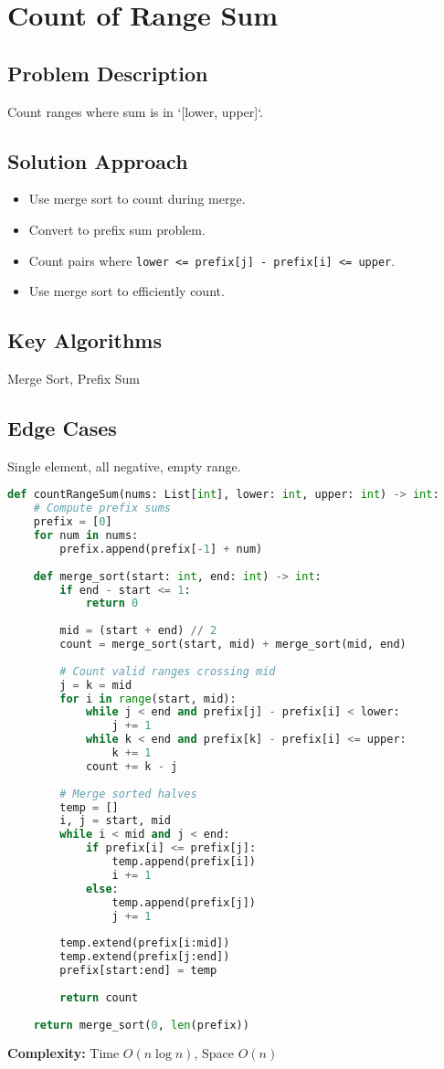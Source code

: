 \documentclass[10pt, a4paper]{article}
\begin{document}
\section{Count of Range Sum}
\subsection*{Problem Description}
Count ranges where sum is in `[lower, upper]`.

\subsection*{Solution Approach}
\begin{itemize}
    \item Use merge sort to count during merge.
    \item Convert to prefix sum problem.
    \item Count pairs where \texttt{lower <= prefix[j] - prefix[i] <= upper}.
    \item Use merge sort to efficiently count.
\end{itemize}

\subsection*{Key Algorithms}
Merge Sort, Prefix Sum

\subsection*{Edge Cases}
Single element, all negative, empty range.

\begin{lstlisting}[language=Python]
def countRangeSum(nums: List[int], lower: int, upper: int) -> int:
    # Compute prefix sums
    prefix = [0]
    for num in nums:
        prefix.append(prefix[-1] + num)
    
    def merge_sort(start: int, end: int) -> int:
        if end - start <= 1:
            return 0
        
        mid = (start + end) // 2
        count = merge_sort(start, mid) + merge_sort(mid, end)
        
        # Count valid ranges crossing mid
        j = k = mid
        for i in range(start, mid):
            while j < end and prefix[j] - prefix[i] < lower:
                j += 1
            while k < end and prefix[k] - prefix[i] <= upper:
                k += 1
            count += k - j
        
        # Merge sorted halves
        temp = []
        i, j = start, mid
        while i < mid and j < end:
            if prefix[i] <= prefix[j]:
                temp.append(prefix[i])
                i += 1
            else:
                temp.append(prefix[j])
                j += 1
        
        temp.extend(prefix[i:mid])
        temp.extend(prefix[j:end])
        prefix[start:end] = temp
        
        return count
    
    return merge_sort(0, len(prefix))
\end{lstlisting}
\textbf{Complexity:} Time $O(n \log n)$, Space $O(n)$
\end{document}
